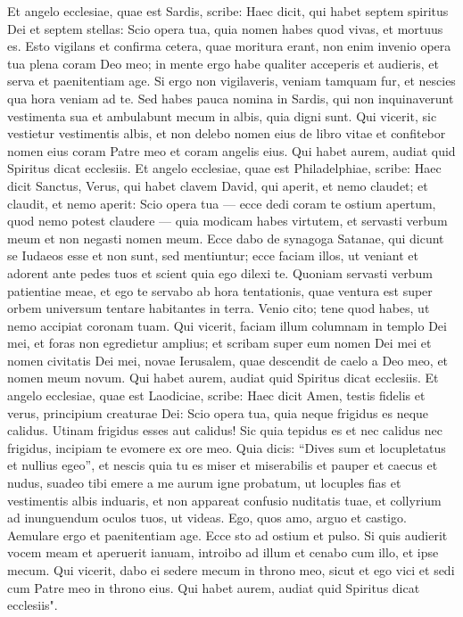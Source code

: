 \begin{biblechapter}  
\verse Et angelo ecclesiae, quae est Sardis, scribe: Haec dicit, qui habet septem spiritus Dei et septem stellas: Scio opera tua, quia nomen habes quod vivas, et mortuus es. 
\verse Esto vigilans et confirma cetera, quae moritura erant, non enim invenio opera tua plena coram Deo meo;  
\verse in mente ergo habe qualiter acceperis et audieris, et serva et paenitentiam age. Si ergo non vigilaveris, veniam tamquam fur, et nescies qua hora veniam ad te. 
\verse Sed habes pauca nomina in Sardis, qui non inquinaverunt vestimenta sua et ambulabunt mecum in albis, quia digni sunt. 
\verse Qui vicerit, sic vestietur vestimentis albis, et non delebo nomen eius de libro vitae et confitebor nomen eius coram Patre meo et coram angelis eius. 
\verse Qui habet aurem, audiat quid Spiritus dicat ecclesiis. 
\verse Et angelo ecclesiae, quae est Philadelphiae, scribe: Haec dicit Sanctus, Verus, qui habet clavem David, qui aperit, et nemo claudet; et claudit, et nemo aperit: 
\verse Scio opera tua — ecce dedi coram te ostium apertum, quod nemo potest claudere — quia modicam habes virtutem, et servasti verbum meum et non negasti nomen meum. 
\verse Ecce dabo de synagoga Satanae, qui dicunt se Iudaeos esse et non sunt, sed mentiuntur; ecce faciam illos, ut veniant et adorent ante pedes tuos et scient quia ego dilexi te. 
\verse Quoniam servasti verbum patientiae meae, et ego te servabo ab hora tentationis, quae ventura est super orbem universum tentare habitantes in terra. 
\verse Venio cito; tene quod habes, ut nemo accipiat coronam tuam. 
\verse Qui vicerit, faciam illum columnam in templo Dei mei, et foras non egredietur amplius; et scribam super eum nomen Dei mei et nomen civitatis Dei mei, novae Ierusalem, quae descendit de caelo a Deo meo, et nomen meum novum. 
\verse Qui habet aurem, audiat quid Spiritus dicat ecclesiis. 
\verse Et angelo ecclesiae, quae est Laodiciae, scribe: Haec dicit Amen, testis fidelis et verus, principium creaturae Dei: 
\verse Scio opera tua, quia neque frigidus es neque calidus. Utinam frigidus esses aut calidus! 
\verse Sic quia tepidus es et nec calidus nec frigidus, incipiam te evomere ex ore meo. 
\verse Quia dicis: “Dives sum et locupletatus et nullius egeo”, et nescis quia tu es miser et miserabilis et pauper et caecus et nudus,  
\verse suadeo tibi emere a me aurum igne probatum, ut locuples fias et vestimentis albis induaris, et non appareat confusio nuditatis tuae, et collyrium ad inunguendum oculos tuos, ut videas. 
\verse Ego, quos amo, arguo et castigo. Aemulare ergo et paenitentiam age. 
\verse Ecce sto ad ostium et pulso. Si quis audierit vocem meam et aperuerit ianuam, introibo ad illum et cenabo cum illo, et ipse mecum. 
\verse Qui vicerit, dabo ei sedere mecum in throno meo, sicut et ego vici et sedi cum Patre meo in throno eius. 
\verse Qui habet aurem, audiat quid Spiritus dicat ecclesiis". 
\end{biblechapter}


